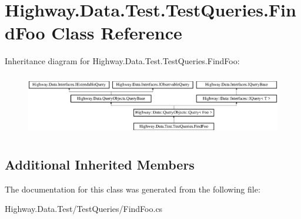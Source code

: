 \hypertarget{class_highway_1_1_data_1_1_test_1_1_test_queries_1_1_find_foo}{\section{Highway.\-Data.\-Test.\-Test\-Queries.\-Find\-Foo Class Reference}
\label{class_highway_1_1_data_1_1_test_1_1_test_queries_1_1_find_foo}
}
Inheritance diagram for Highway.\-Data.\-Test.\-Test\-Queries.\-Find\-Foo\-:\begin{figure}[H]
\begin{center}
\leavevmode
\includegraphics[height=2.725061cm]{class_highway_1_1_data_1_1_test_1_1_test_queries_1_1_find_foo}
\end{center}
\end{figure}
\subsection*{Additional Inherited Members}


The documentation for this class was generated from the following file\-:\begin{DoxyCompactItemize}
\item 
Highway.\-Data.\-Test/\-Test\-Queries/Find\-Foo.\-cs\end{DoxyCompactItemize}
